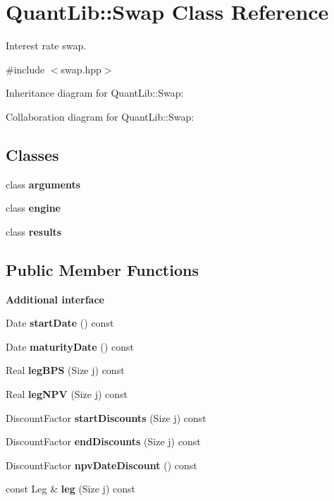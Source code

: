 \section{Quant\+Lib\+:\+:Swap Class Reference}
\label{class_quant_lib_1_1_swap}


Interest rate swap.  




{\ttfamily \#include $<$swap.\+hpp$>$}



Inheritance diagram for Quant\+Lib\+:\+:Swap\+:


Collaboration diagram for Quant\+Lib\+:\+:Swap\+:
\subsection*{Classes}
\begin{DoxyCompactItemize}
\item 
class {\bf arguments}
\item 
class {\bf engine}
\item 
class {\bf results}
\end{DoxyCompactItemize}
\subsection*{Public Member Functions}
\begin{Indent}{\bf Additional interface}\par
\begin{DoxyCompactItemize}
\item 
Date {\bfseries start\+Date} () const \label{class_quant_lib_1_1_swap_abd8324d97fe0a988efe5585d96beab62}

\item 
Date {\bfseries maturity\+Date} () const \label{class_quant_lib_1_1_swap_a9f9257fc68196de403d036f1575089df}

\item 
Real {\bfseries leg\+B\+PS} (Size j) const \label{class_quant_lib_1_1_swap_a8c80c921a35a4d177db6f02df3d99f79}

\item 
Real {\bfseries leg\+N\+PV} (Size j) const \label{class_quant_lib_1_1_swap_acc680c10440d9a5d8b4387654ef0fa43}

\item 
Discount\+Factor {\bfseries start\+Discounts} (Size j) const \label{class_quant_lib_1_1_swap_aee7271fdd52e4c01676043a6503d9203}

\item 
Discount\+Factor {\bfseries end\+Discounts} (Size j) const \label{class_quant_lib_1_1_swap_a5e2f2359e2c0e542eaf49cec6b8a0e9b}

\item 
Discount\+Factor {\bfseries npv\+Date\+Discount} () const \label{class_quant_lib_1_1_swap_a359f83c97b8023534c004c69bce7e876}

\item 
const Leg \& {\bfseries leg} (Size j) const \label{class_quant_lib_1_1_swap_a8c26a2e8d54a9aeeaec79ed1af8b5389}

\end{DoxyCompactItemize}
\end{Indent}
